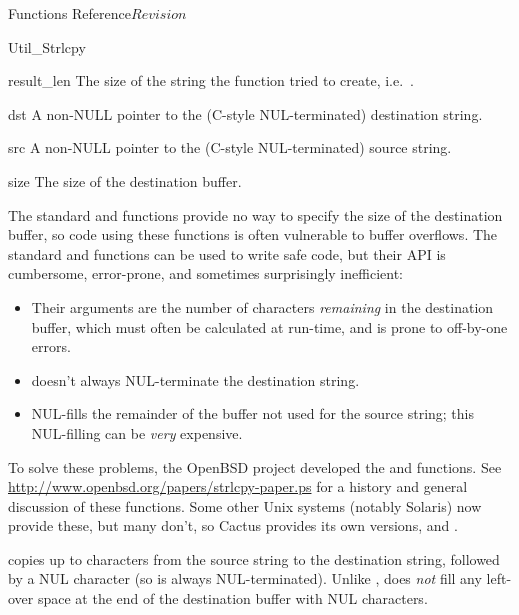 \begin{cactuspart}{ Functions Reference}{}{$Revision$}
\begin{FunctionDescription}{Util\_Strlcpy}
\begin{ResultSection}
\begin{Result}{result\_len}
The size of the string the function tried to create, i.e.\
.
\end{Result}
\end{ResultSection}

\begin{ParameterSection}
\begin{Parameter}{dst}
A non-NULL pointer to the (C-style NUL-terminated) destination string.
\end{Parameter}
\begin{Parameter}{src}
A non-NULL pointer to the (C-style NUL-terminated) source string.
\end{Parameter}
\begin{Parameter}{size}
The size of the destination buffer.
\end{Parameter}
\end{ParameterSection}

\begin{Discussion}
The standard  and  functions provide
no way to specify the size of the destination buffer, so code using
these functions is often vulnerable to buffer overflows.  The standard
\code{strncat()} and \code{strncpy()} functions can be used to write
safe code, but their API is cumbersome, error-prone, and sometimes
surprisingly inefficient:
\begin{itemize}
\item	Their  arguments are the number of characters
	{\em remaining\/} in the destination buffer, which must
	often be calculated at run-time, and is prone to off-by-one
	errors.
\item	{} doesn't always NUL-terminate the destination string.
\item	\code{strncpy()} NUL-fills the remainder of the buffer not
	used for the source string; this NUL-filling can be {\em very\/}
	expensive.
\end{itemize}

To solve these problems, the OpenBSD project developed the
 and  functions.  See
\url{http://www.openbsd.org/papers/strlcpy-paper.ps}
for a history and general discussion of these functions.
Some other Unix systems (notably Solaris) now provide these,
but many don't, so Cactus provides its own versions,
 and .

 copies up to  characters from the
source string to the destination string, followed by a NUL character
(so \code{dst} is always NUL-terminated).  Unlike \code{strncpy()},
\code{Util\_Strlcpy()} does {\em not\/} fill any left-over space at
the end of the destination buffer with NUL characters.
\end{Discussion}


\end{FunctionDescription}
\end{cactuspart}
